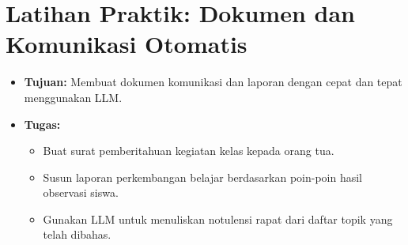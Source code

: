 \section*{Latihan Praktik: Dokumen dan Komunikasi Otomatis}
\begin{itemize}
	\item \textbf{Tujuan:} Membuat dokumen komunikasi dan laporan dengan cepat dan tepat menggunakan LLM.
	\item \textbf{Tugas:}
	\begin{itemize}
		\item Buat surat pemberitahuan kegiatan kelas kepada orang tua.
		\item Susun laporan perkembangan belajar berdasarkan poin-poin hasil observasi siswa.
		\item Gunakan LLM untuk menuliskan notulensi rapat dari daftar topik yang telah dibahas.
	\end{itemize}
\end{itemize}
